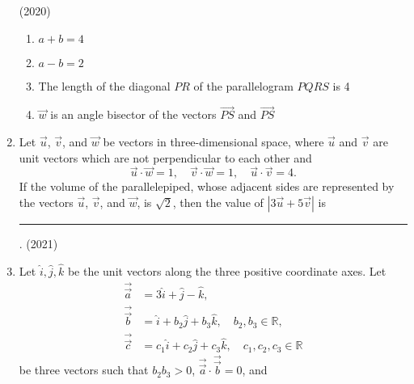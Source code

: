 \begin{enumerate}[label=\thesubsection.\arabic*.,ref=\thesubsection.\theenumi]
\hfill (2020)
\begin{enumerate}
 \item $a + b = 4$
 \item $a - b = 2$
 \item The length of the diagonal $PR$ of the parallelogram $PQRS$ is 4
 \item $\overrightarrow{w}$ is an angle bisector of the vectors $\overrightarrow{PS}$ and $\overrightarrow{PS}$
\end{enumerate}
    \item Let $\vec{u}$, $\vec{v}$, and $\vec{w}$ be vectors in three-dimensional space, where $\vec{u}$ and $\vec{v}$ are unit vectors which are not perpendicular to each other and  
    \[
    \vec{u} \cdot \vec{w} = 1, \quad \vec{v} \cdot \vec{w} = 1, \quad \vec{u} \cdot \vec{v} = 4.
    \]  
    If the volume of the parallelepiped, whose adjacent sides are represented by the vectors $\vec{u}$, $\vec{v}$, and $\vec{w}$, is $\sqrt{2}$, then the value of $|3\vec{u} + 5\vec{v}|$ is \rule{1cm}{0.1pt}.
    \hfill (2021)
\item Let $\hat{i}, \hat{j}, \hat{k}$ be the unit vectors along the three positive coordinate axes. Let  
	    \begin{align*}
		    \vec{\overrightarrow{a}} &= 3\hat{i} + \hat{j} - \hat{k}, 
		    \\
		    \vec{\overrightarrow{b}}  &= \hat{i} + b_2 \hat{j} + b_3 \hat{k}, \quad b_2, b_3 \in \mathbb{R},
	\\
		    \vec{\overrightarrow{c}} &= c_1 \hat{i} + c_2 \hat{j} + c_3 \hat{k}, \quad c_1, c_2, c_3 \in \mathbb{R}
	    \end{align*}
    be three vectors such that $b_2 b_3 > 0$, $\vec{\overrightarrow{a}} \cdot \vec{\overrightarrow{b}} = 0$, and  


\end{enumerate}
